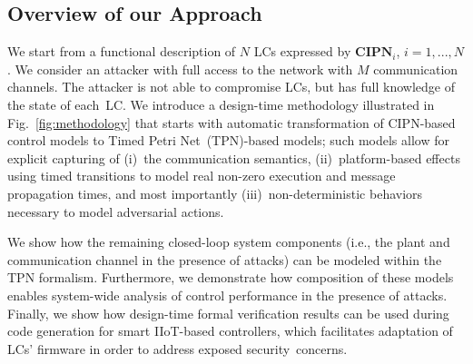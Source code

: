 \subsection{Overview of our Approach}
We start from a functional description %
of $N$ LCs expressed by $\mathbf{CIPN}_i$, $i=1,...,N$. We consider an attacker with full access to the network with {$M$ communication channels}. %
The attacker is not able to compromise LCs, but has full knowledge of the state of each~LC. %
%
We introduce a design-time methodology illustrated in Fig.~\ref{fig:methodology} that starts with automatic transformation of CIPN-based control models to Timed Petri Net~(TPN)-based models; such models allow for explicit capturing of (i)~the communication semantics, (ii)~platform-based effects using timed transitions to model real non-zero execution and message propagation times, and most importantly (iii)~non-deterministic behaviors necessary to model adversarial actions. %

We show how the remaining closed-loop system components (i.e., the plant and communication channel in the presence of attacks) can be modeled within the TPN formalism. Furthermore, we  demonstrate how composition of these models enables system-wide analysis of control performance in the presence of attacks. Finally, we show how design-time formal verification results can be used during code generation for smart IIoT-based controllers, which facilitates adaptation  of LCs' firmware in order to address exposed security~concerns. %

